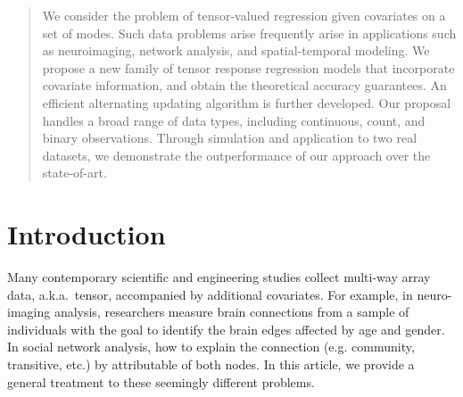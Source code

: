 \documentclass[twoside]{article}
\theoremstyle{plain}
\theoremstyle{definition}
\begin{document}
%

%


\begin{abstract}
We consider the problem of tensor-valued regression given covariates on a set of modes. Such data problems arise frequently arise in applications such as neuroimaging, network analysis, and spatial-temporal modeling. We propose a new family of tensor response regression models that incorporate covariate information, and obtain the theoretical accuracy guarantees. An efficient alternating updating algorithm is further developed. Our proposal handles a broad range of data types, including continuous, count, and binary observations. Through simulation and application to two real datasets, we demonstrate the outperformance of our approach over the state-of-art. \end{abstract}

\section{Introduction}

Many contemporary scientific and engineering studies collect multi-way array data, a.k.a.\ tensor, accompanied by additional covariates. For example, in neuro-imaging analysis, researchers measure brain connections from a sample of individuals with the goal to identify the brain edges affected by age and gender. In social network analysis, how to explain the connection (e.g. community, transitive, etc.) by attributable of both nodes. %
In this article, we provide a general treatment to these seemingly different problems.
\end{document}
